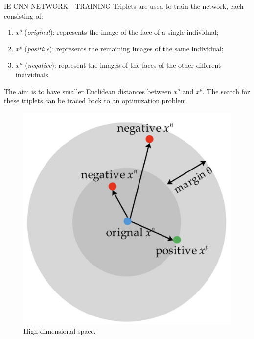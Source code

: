 \begin{frame}{IE-CNN NETWORK - TRAINING}
    Triplets are used to train the network, each consisting of:
    \begin{enumerate}
        \item $x^o$ (\emph{original}): represents the image of the face of a single individual;
        \item $x^p$ (\emph{positive}): represents the remaining images of the same individual;
        \item $x^n$ (\emph{negative}): represent the images of the faces of the other different 
        individuals.
    \end{enumerate}
    The aim is to have smaller Euclidean distances between $x^o$ and $x^p$. The 
    search for these triplets can be traced back to an optimization problem.
    \begin{figure}[h!]
        \centering
        \includegraphics[width = 0.3\linewidth]{images/paper9/SET.png}
        \centering
        \caption{High-dimensional space.}
        \label{fig:HDS}
    \end{figure}
\end{frame}


